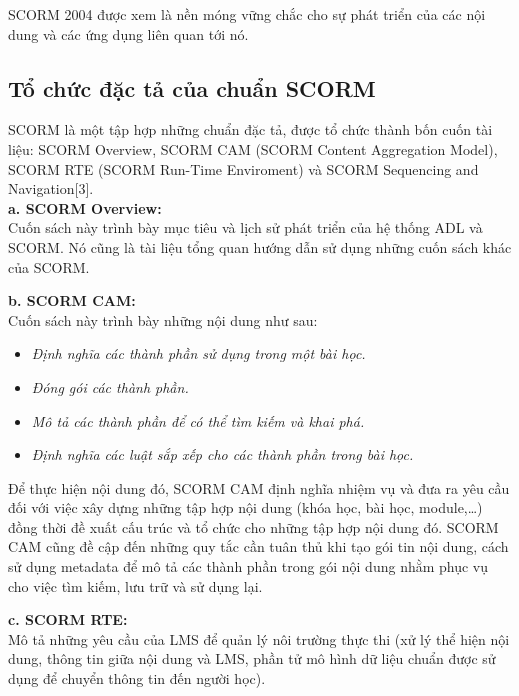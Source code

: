 	SCORM 2004 được xem là nền móng vững chắc cho sự phát triển của các nội dung và các ứng dụng liên quan tới nó.\\


	\subsection{Tổ chức đặc tả của chuẩn SCORM}
	
	SCORM là một tập hợp những chuẩn đặc tả, được tổ chức thành bốn cuốn tài liệu: SCORM Overview, SCORM CAM (SCORM Content Aggregation Model), SCORM RTE (SCORM Run-Time Enviroment) và SCORM Sequencing and Navigation[3].\\


	\textbf{a. SCORM Overview:}\\
	Cuốn sách này trình bày mục tiêu và lịch sử phát triển của hệ thống ADL và SCORM. Nó cũng là tài liệu tổng quan hướng dẫn sử dụng những cuốn sách khác của SCORM.\\
	
	\vspace{0.5cm}
	
	\textbf{b. SCORM CAM:}\\
	Cuốn sách này trình bày những nội dung như sau:
	\begin{itemize}
		\item \textit{Định nghĩa các thành phần sử dụng trong một bài học.}
		\item \textit{Đóng gói các thành phần.}
		\item \textit{Mô tả các thành phần để có thể tìm kiếm và khai phá.}
		\item \textit{Định nghĩa các luật sắp xếp cho các thành phần trong bài học.}									
	\end{itemize}


	Để thực hiện nội dung đó, SCORM CAM định nghĩa nhiệm vụ và đưa ra yêu cầu đối với việc xây dựng những tập hợp nội dung (khóa học, bài học, module,…) đồng thời đề xuất cấu trúc và tổ chức cho những tập hợp nội dung đó. SCORM CAM cũng đề cập đến những quy tắc cần tuân thủ khi tạo gói tin nội dung, cách sử dụng metadata để mô tả các thành phần trong gói nội dung nhằm phục vụ cho việc tìm kiếm, lưu trữ và sử dụng lại.\\
	\vspace{0.5cm} 
	
	\textbf{c. SCORM RTE:}\\	
	Mô tả những yêu cầu của LMS để quản lý nôi trường thực thi (xử lý thể hiện nội dung, thông tin giữa nội dung và LMS, phần tử mô hình dữ liệu chuẩn được sử dụng để chuyển thông tin đến người học).\\
	
